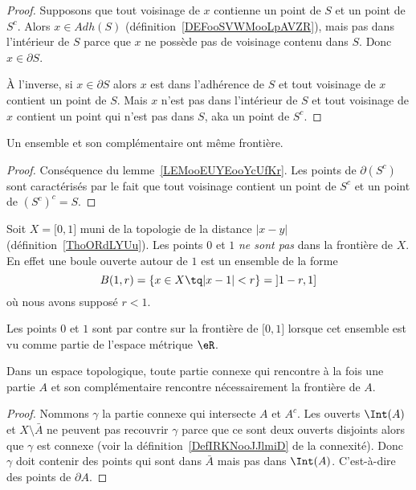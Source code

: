 \begin{proof}
    Supposons que tout voisinage de \( x\) contienne un point de \( S\) et un point de \( S^c\). Alors \( x\in Adh(S)\) (définition~\ref{DEFooSVWMooLpAVZR}), mais pas dans l'intérieur de \( S\) parce que \( x\) ne possède pas de voisinage contenu dans \( S\). Donc \( x\in \partial S\).

    À l'inverse, si \( x\in\partial S\) alors \( x\) est dans l'adhérence de \( S\) et tout voisinage de \( x\) contient un point de \( S\). Mais \( x\) n'est pas dans l'intérieur de \( S\) et tout voisinage de \( x\) contient un point qui n'est pas dans \( S\), aka un point de \( S^c\).
\end{proof}

\begin{corollary}
    Un ensemble et son complémentaire ont même frontière.
\end{corollary}

\begin{proof}
    Conséquence du lemme~\ref{LEMooEUYEooYcUfKr}. Les points de \( \partial(S^c)\) sont caractérisés par le fait que tout voisinage contient un point de \( S^c\) et un point de \( (S^c)^c=S\).
\end{proof}

\begin{example}
    Soit \( X=\mathopen[ 0 , 1 \mathclose]\) muni de la topologie de la distance \( | x-y |\) (définition~\ref{ThoORdLYUu}). Les points \( 0\) et \( 1\) \emph{ne sont pas} dans la frontière de $X$. En effet une boule ouverte autour de \( 1\) est un ensemble de la forme
    \begin{equation}
        B(1,r)=\{ x\in X\tq | x-1 |<r \}=\mathopen] 1-r , 1 \mathclose]
    \end{equation}
    où nous avons supposé \( r<1\).

    Les points \( 0\) et \( 1\) sont par contre sur la frontière de \( \mathopen[ 0 , 1 \mathclose]\) lorsque cet ensemble est vu comme partie de l'espace métrique \( \eR\).
\end{example}

\begin{lemma}        \label{LEMooLKWEooItGnkP}
    Dans un espace topologique, toute partie connexe qui rencontre à la fois une partie \( A\) et son complémentaire rencontre nécessairement la frontière de \( A\).
\end{lemma}

\begin{proof}
    Nommons \( \gamma\) la partie connexe qui intersecte \( A\) et \( A^c\). Les ouverts \( \Int(A)\) et \( X\setminus \bar A\) ne peuvent pas recouvrir \( \gamma\) parce que ce sont deux ouverts disjoints alors que \( \gamma\) est connexe (voir la définition~\ref{DefIRKNooJJlmiD} de la connexité). Donc \( \gamma\) doit contenir des points qui sont dans \( \bar A\) mais pas dans \( \Int(A)\). C'est-à-dire des points de \( \partial A\).
\end{proof}

